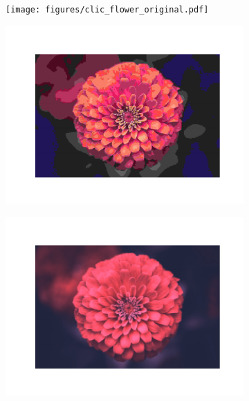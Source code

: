 \begin{figure}[t]
    \vspace{-8pt}
	\begin{subfigure}{.23\textwidth}
		\centering
        \hspace{-7pt}
		\texttt{[image: figures/clic\_flower\_original.pdf]}
	\end{subfigure}%
	\begin{subfigure}{.23\textwidth}
		\centering
		\includegraphics[trim=1.7cm 1cm 1.7cm 1.7cm, clip, width=1\textwidth]{figures/clic_flower_JPEG_bpp_0.137.pdf}
	\end{subfigure}
    \begin{subfigure}{.23\textwidth}
		\centering
		\includegraphics[trim=1.7cm 1cm 1.7cm 1.7cm, clip, width=1\textwidth]{figures/clic_flower_SVD_bpp_0.123.pdf}

\end{subfigure}
\end{figure}
